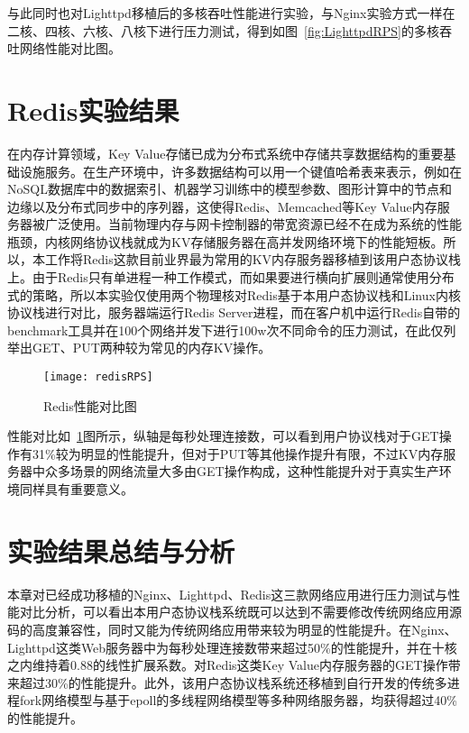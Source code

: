 与此同时也对Lighttpd移植后的多核吞吐性能进行实验，与Nginx实验方式一样在二核、四核、六核、八核下进行压力测试，得到如图~\ref{fig:LighttpdRPS}的多核吞吐网络性能对比图。

\section{Redis实验结果}

在内存计算领域，Key Value存储已成为分布式系统中存储共享数据结构的重要基础设施服务。在生产环境中，许多数据结构可以用一个键值哈希表来表示，例如在NoSQL数据库中的数据索引、机器学习训练中的模型参数、图形计算中的节点和边缘以及分布式同步中的序列器，这使得Redis、Memcached等Key Value内存服务器被广泛使用。当前物理内存与网卡控制器的带宽资源已经不在成为系统的性能瓶颈，内核网络协议栈就成为KV存储服务器在高并发网络环境下的性能短板。所以，本工作将Redis这款目前业界最为常用的KV内存服务器移植到该用户态协议栈上。由于Redis只有单进程一种工作模式，而如果要进行横向扩展则通常使用分布式的策略，所以本实验仅使用两个物理核对Redis基于本用户态协议栈和Linux内核协议栈进行对比，服务器端运行Redis Server进程，而在客户机中运行Redis自带的benchmark工具并在100个网络并发下进行100w次不同命令的压力测试，在此仅列举出GET、PUT两种较为常见的内存KV操作。

\vspace{-10pt}
\begin{figure}[H] %
  \centering
  \texttt{[image: redisRPS]}
  \caption{Redis性能对比图}
  \label{fig:redisRPS}
\end{figure}
\vspace{-10pt}

性能对比如~\ref{fig:redisRPS}图所示，纵轴是每秒处理连接数，可以看到用户协议栈对于GET操作有31\%较为明显的性能提升，但对于PUT等其他操作提升有限，不过KV内存服务器中众多场景的网络流量大多由GET操作构成，这种性能提升对于真实生产环境同样具有重要意义。

\section{实验结果总结与分析}

本章对已经成功移植的Nginx、Lighttpd、Redis这三款网络应用进行压力测试与性能对比分析，可以看出本用户态协议栈系统既可以达到不需要修改传统网络应用源码的高度兼容性，同时又能为传统网络应用带来较为明显的性能提升。在Nginx、Lighttpd这类Web服务器中为每秒处理连接数带来超过50\%的性能提升，并在十核之内维持着0.88的线性扩展系数。对Redis这类Key Value内存服务器的GET操作带来超过30\%的性能提升。此外，该用户态协议栈系统还移植到自行开发的传统多进程fork网络模型与基于epoll的多线程网络模型等多种网络服务器，均获得超过40\%的性能提升。